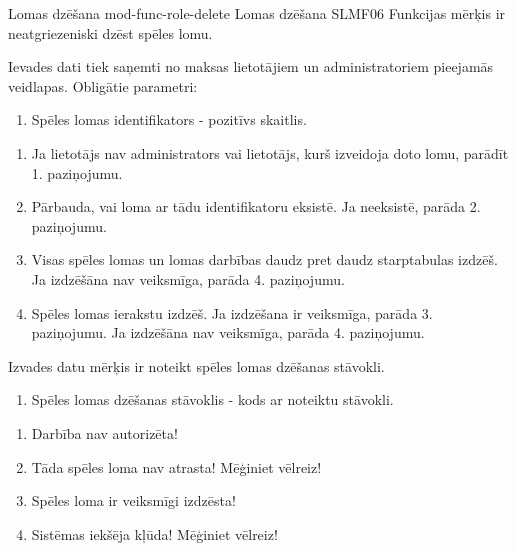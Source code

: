 \moduleFunctionTable
{Lomas dzēšana}
{mod-func-role-delete}
{Lomas dzēšana}
{SLMF06}
{
	Funkcijas mērķis ir neatgriezeniski dzēst spēles lomu.
}
{
	Ievades dati tiek saņemti no maksas lietotājiem un administratoriem pieejamās veidlapas.
	Obligātie parametri:
	\begin{enumerate}
		\item Spēles lomas identifikators - pozitīvs skaitlis.
	\end{enumerate}
}
{
	\begin{enumerate}
		\item Ja lietotājs nav administrators vai lietotājs, kurš izveidoja doto lomu, parādīt 1. paziņojumu.
		\item Pārbauda, vai loma ar tādu identifikatoru eksistē.
		      Ja neeksistē, parāda 2. paziņojumu.
		\item Visas spēles lomas un lomas darbības daudz pret daudz starptabulas izdzēš.
		      Ja izdzēšāna nav veiksmīga, parāda 4. paziņojumu.
		\item Spēles lomas ierakstu izdzēš.
		      Ja izdzēšana ir veiksmīga, parāda 3. paziņojumu.
		      Ja izdzēšāna nav veiksmīga, parāda 4. paziņojumu.
	\end{enumerate}
}
{
	Izvades datu mērķis ir noteikt spēles lomas dzēšanas stāvokli.
	\begin{enumerate}
		\item Spēles lomas dzēšanas stāvoklis - kods ar noteiktu stāvokli.
	\end{enumerate}
}
{
	\begin{enumerate}
		\item Darbība nav autorizēta!
		\item Tāda spēles loma nav atrasta! Mēģiniet vēlreiz!
		\item Spēles loma ir veiksmīgi izdzēsta!
		\item Sistēmas iekšēja kļūda! Mēģiniet vēlreiz!
	\end{enumerate}
}
